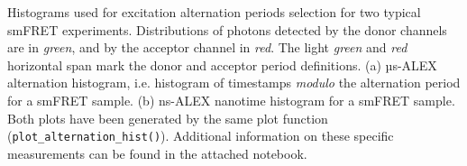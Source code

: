 \label{fig:altern_hist_double}
Histograms used for excitation alternation periods selection for two typical smFRET experiments. 
Distributions of photons detected by the donor channels are in \textit{green}, and by the acceptor channel in \textit{red}.
The light \textit{green} and \textit{red} horizontal span mark the donor and acceptor period definitions.
(a) µs-ALEX alternation histogram, i.e. histogram of timestamps \textit{modulo} the alternation period for a smFRET sample. 
(b) ns-ALEX nanotime histogram for a smFRET sample. Both plots have been generated by the same plot function (\texttt{plot\_alternation\_hist()}). 
Additional information on these specific measurements can be found in the  attached notebook.